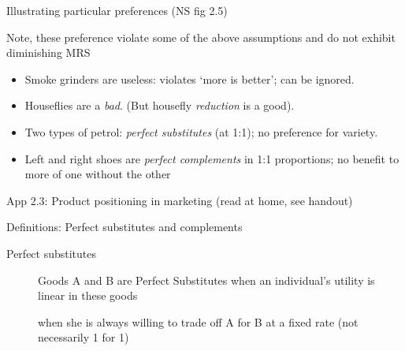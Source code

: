 \documentclass[table]{beamer}
\begin{document}
\begin{frame}
\begin{block}{Illustrating particular preferences (NS fig 2.5)}
\begin{figure}
{}

\end{figure}

Note, these preference violate some of the above assumptions and do not
exhibit diminishing MRS

\begin{itemize}
\item
  Smoke grinders are useless: violates `more is better'; can be ignored.
\item
  Houseflies are a \emph{bad}. (But housefly \emph{reduction} is a
  good).
\item
  Two types of petrol: \emph{perfect substitutes} (at 1:1); no
  preference for variety.
\item
  Left and right shoes are \emph{perfect complements} in 1:1
  proportions; no benefit to more of one without the other
\end{itemize}

\end{block}

\begin{block}{App 2.3: Product positioning in marketing (read at home,
see handout)}

\end{block}

\end{frame}

\begin{frame}{Definitions: Perfect substitutes and complements}
\protect\hypertarget{definitions-perfect-substitutes-and-complements}{}

\begin{description}
\item[Perfect substitutes]
Goods A and B are Perfect Substitutes when an individual's utility is
linear in these goods

when she is always willing to trade off A for B at a fixed rate (not
necessarily 1 for 1)
\end{description}

\end{frame}
\end{document}
